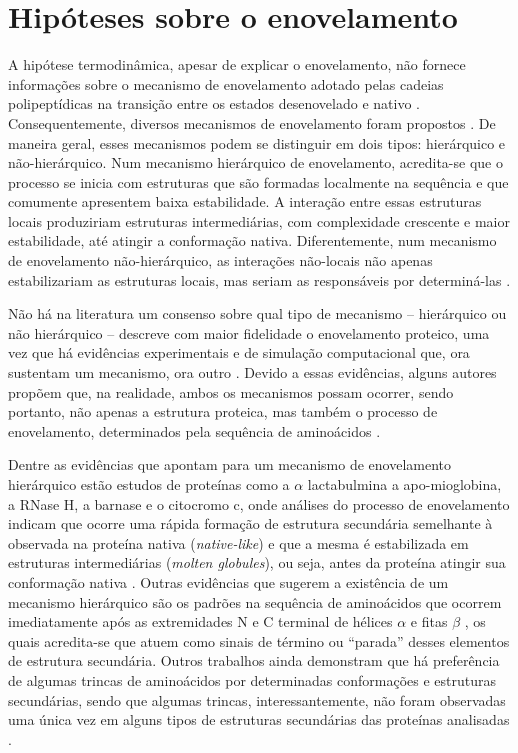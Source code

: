 \section{Hipóteses sobre o enovelamento}

A hipótese termodinâmica, apesar de explicar o enovelamento, não fornece informações sobre o mecanismo de enovelamento adotado pelas cadeias polipeptídicas na transição entre os estados desenovelado e nativo \cite{Rose2006}. Consequentemente, diversos mecanismos de enovelamento foram propostos \cite{Dill1997, Dill2008, Dill2012}. De maneira geral, esses mecanismos podem se distinguir em dois tipos: hierárquico e não-hierárquico. Num mecanismo hierárquico de enovelamento, acredita-se que o processo se inicia com estruturas que são formadas localmente na sequência e que comumente apresentem baixa estabilidade. A interação entre essas estruturas locais produziriam estruturas intermediárias, com complexidade crescente e maior estabilidade, até atingir a conformação nativa. Diferentemente, num mecanismo de enovelamento não-hierárquico, as interações não-locais não apenas estabilizariam as estruturas locais, mas seriam as responsáveis por determiná-las \cite{Baldwin1999a ,Baldwin1999b}. 


Não há na literatura um consenso sobre qual tipo de mecanismo -- hierárquico ou não hierárquico -- descreve com maior fidelidade o enovelamento proteico, uma vez que há evidências experimentais e de simulação computacional que, ora sustentam um mecanismo, ora outro \cite{Baldwin1999b, Daggett2003}. Devido a essas evidências, alguns autores propõem que, na realidade, ambos os mecanismos possam ocorrer, sendo portanto, não apenas a estrutura proteica, mas também o processo de enovelamento, determinados pela sequência de aminoácidos \cite{Daggett2003}.

Dentre as evidências que apontam para um mecanismo de enovelamento hierárquico estão estudos de proteínas como a $\alpha$ lactabulmina a apo-mioglobina, a RNase H, a barnase e o citocromo c, onde análises do processo de enovelamento indicam que ocorre uma rápida formação de estrutura secundária semelhante à observada na proteína nativa (\textit{native-like}) e que a mesma é estabilizada em estruturas intermediárias (\textit{molten globules}), ou seja, antes da proteína atingir sua conformação nativa \cite{Baldwin1999a}. Outras evidências que sugerem a existência de um mecanismo hierárquico são os padrões na sequência de aminoácidos que ocorrem imediatamente após as extremidades N e C terminal de hélices $\alpha$ \cite{Harper1993, Aurora1994, Aurora1997, Baldwin1999a} e fitas $\beta$ \cite{Colloch1991}, os quais acredita-se que atuem como sinais de término ou “parada” desses elementos de estrutura secundária. Outros trabalhos ainda demonstram que há preferência de algumas trincas de aminoácidos por determinadas conformações e estruturas secundárias\cite{Betancourt2004,Otaki2010}, sendo que algumas trincas, interessantemente, não foram observadas uma única vez em alguns tipos de estruturas secundárias das proteínas analisadas \cite{Otaki2010}.


